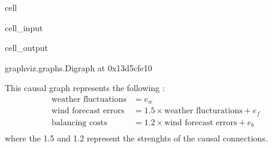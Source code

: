 \documentclass[letterpaper,10pt,english]{jupyterBook}
\begin{document}
\begin{sphinxuseclass}{cell}\begin{sphinxVerbatimInput}

\begin{sphinxuseclass}{cell_input}
\begin{sphinxVerbatim}[commandchars=\\\{\}]
   
   

  \PYG{p}{[}\PYG{p}{[}  \PYG{p}{]}
              \PYG{p}{[}  \PYG{p}{]}
              \PYG{p}{[}  \PYG{p}{]}\PYG{p}{]}

 \PYG{p}{[}  \PYG{p}{]}
\end{sphinxVerbatim}

\end{sphinxuseclass}\end{sphinxVerbatimInput}
\begin{sphinxVerbatimOutput}

\begin{sphinxuseclass}{cell_output}
\begin{sphinxVerbatim}[commandchars=\\\{\}]
\PYGZlt{}graphviz.graphs.Digraph at 0x13d5cfe10\PYGZgt{}
\end{sphinxVerbatim}

\end{sphinxuseclass}\end{sphinxVerbatimOutput}

\end{sphinxuseclass}
\sphinxAtStartPar
This causal graph represents the following :
\label{equation:notebooks/basic_dag_structures:93a9bb60-6472-4ac6-ae4e-64fb18ce8788}\begin{align}
\text{weather fluctuations} &= e_w \\
\text{wind forecast errors} &= 1.5 \times \text{weather flucturations} + e_f \\
\text{balancing costs} &= 1.2 \times \text{wind forecast errors} + e_b \\
\end{align}
\sphinxAtStartPar
where the  1.5 and 1.2 represent the strenghts of the causal connections.
\end{document}
